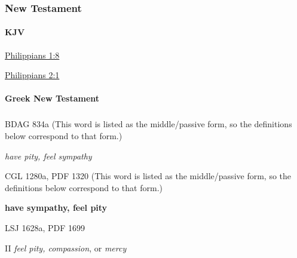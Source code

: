 		
	\subsubsection{New Testament} %
		\label{BOWELS-NT}
	
		\paragraph{KJV}
			\label{BOWELS-NT-KJV}
			
	
			
			\begin{compactdesc}
				\item[{\hyperref[PHILIPPIANS-1-8]{Philippians 1:8}}]
				\item[{\hyperref[PHILIPPIANS-2-1]{Philippians 2:1}}]
			\end{compactdesc}
			
		\paragraph{Greek New Testament} %
			\label{BOWELS-GREEK}
		
			\subparagraph{\texorpdfstring{}{}}
				\label{SPLANCHNIZO}
			
				\begin{compactdesc}
					\item[BDAG 834a] (This word is listed as the middle/passive form, so the definitions below correspond to that form.)
						\begin{compactitem}
							\item \textit{have pity, feel sympathy}
						\end{compactitem}
					\item[CGL 1280a, PDF 1320] (This word is listed as the middle/passive form, so the definitions below correspond to that form.)
						\begin{compactitem}
							\item \textbf{have sympathy, feel pity}
						\end{compactitem}
					\item[LSJ 1628a, PDF 1699] \textbf{}
						\begin{compactitem}
							\item[II] \textit{feel pity, compassion}, or \textit{mercy}
						\end{compactitem}
				\end{compactdesc}
				
